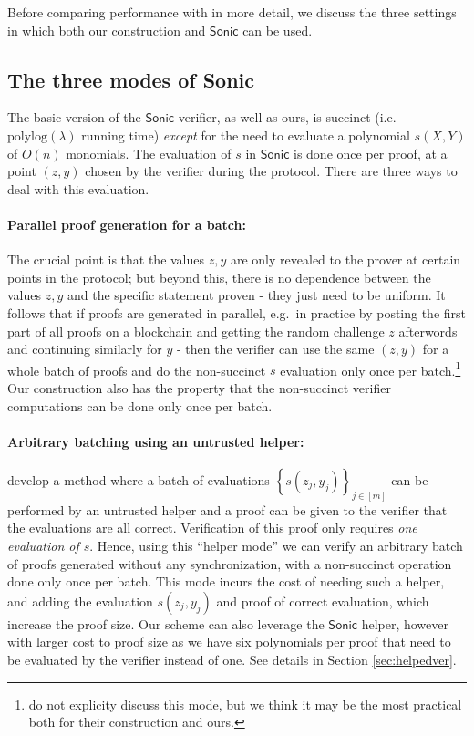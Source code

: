 \documentclass[11pt]{article}
\numberwithin{figure}{section} %
\newcommand{\set}[1]{\ensuremath{\left\{#1\right\}}\xspace}
\newcommand{\polylog}{\ensuremath{\mathrm{polylog}(\lambda)}\xspace}
\newcommand{\ariel}[1]{{\color{blue}{\textit{#1 --- ariel gabizon}}}}
\newcommand{\ariel}[1]{}
\newcommand{\sett}[2]{\ensuremath{\set{#1}_{#2}}\xspace}
\newcommand{\sonic}{\ensuremath{\mathsf{Sonic}}\xspace}
\begin{document}
Before comparing performance with \cite{sonic} in more detail, we discuss the three settings in which both our construction and \sonic can be used.
\subsection{The three modes of Sonic}\label{subsec:sonicmodes}
The basic version of the \sonic verifier, as well as ours, is succinct (i.e.\ \polylog running time)
\emph{except} for the need to evaluate a polynomial $s(X,Y)$ of $O(n)$ monomials.
The evaluation of $s$ in \sonic is done once per proof, at a point $(z,y)$ chosen by the verifier during the protocol.
There are three ways to deal with this evaluation.
\paragraph{Parallel proof generation for a batch:}
The crucial point is that the values $z,y$ are only revealed to the prover at certain points in the protocol; but beyond this, there is no dependence between the values $z,y$ and the specific statement proven - they just need to be uniform.
It follows that if proofs are generated in parallel, e.g.\ in practice by posting the first part of all proofs on a blockchain and getting the random challenge $z$ afterwords and continuing similarly for $y$ - then the verifier can use the same $(z,y)$ for a whole batch of proofs and do the non-succinct $s$ evaluation only once per batch.\footnote{\cite{sonic} do not explicity discuss this mode, but we think it may be the most practical both for their construction and ours.}
Our construction also has the property that the non-succinct verifier computations can be done only once per batch.
\ariel{compute exact cost of computing $Q$}

\paragraph{Arbitrary batching using an untrusted helper:}
\cite{sonic} develop a method where a batch of evaluations \sett{s(z_j,y_j)}{j\in [m]}
can be performed by an untrusted helper and a proof can be given to the verifier that the evaluations are all correct. Verification of this proof only requires \emph{one evaluation of $s$}. Hence, using this ``helper mode'' we can verify an arbitrary batch of proofs generated without any synchronization, with a non-succinct operation done only once per batch. This mode incurs the cost of needing such a helper, and adding the evaluation $s(z_j,y_j)$ and proof of correct evaluation, which increase the proof size.
Our scheme can also leverage the \sonic helper, however with larger cost to proof size as we have six polynomials per proof that need to be evaluated by the verifier instead of one.
See details in Section \ref{sec:helpedver}.
\end{document}
